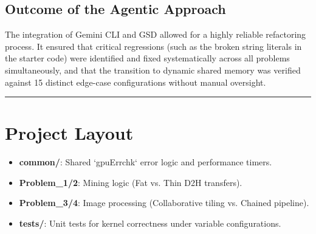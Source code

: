 \documentclass[11pt]{article}
\begin{document}
\subsection*{Outcome of the Agentic Approach}
The integration of Gemini CLI and GSD allowed for a highly reliable refactoring process. It ensured that critical regressions (such as the broken string literals in the starter code) were identified and fixed systematically across all problems simultaneously, and that the transition to dynamic shared memory was verified against 15 distinct edge-case configurations without manual oversight.

\noindent\rule{\textwidth}{0.4pt}

\section*{\color{white}Project Layout}
\begin{itemize}
    \item \textbf{common/}: Shared `gpuErrchk` error logic and performance timers.
    \item \textbf{Problem\_1/2}: Mining logic (Fat vs. Thin D2H transfers).
    \item \textbf{Problem\_3/4}: Image processing (Collaborative tiling vs. Chained pipeline).
    \item \textbf{tests/}: Unit tests for kernel correctness under variable configurations.
\end{itemize}
\end{document}
